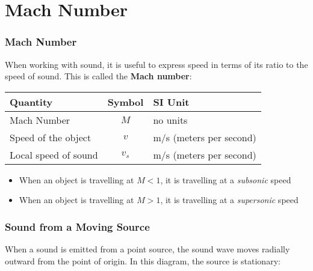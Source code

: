 \documentclass[12pt,aspectratio=169]{beamer}
\newcommand{\eq}[2]{\vspace{#1}{\Large\begin{displaymath}#2\end{displaymath}}}
\begin{document}
\section[$M$]{Mach Number}

\begin{frame}
  \frametitle{Mach Number}
  When working with sound, it is useful to express speed in terms of its ratio
  to the speed of sound. This is called the \textbf{Mach number}:
  
  \eq{-.2in}{
    \boxed{M=\frac{v}{v_s}}
  }
  \begin{center}
    \begin{tabular}{l|c|l}
      \rowcolor{pink}
      \textbf{Quantity} & \textbf{Symbol} & \textbf{SI Unit} \\ \hline
      Mach Number         & $M$   & no units \\
      Speed of the object & $v$   & \si{m/s} (meters per second) \\
      Local speed of sound & $v_s$ & \si{m/s} (meters per second)
    \end{tabular}
  \end{center}
  \begin{itemize}
  \item When an object is travelling at $M<1$, it is travelling at a
    \emph{subsonic} speed
  \item When an object is travelling at $M>1$, it is travelling at a
    \emph{supersonic} speed
  \end{itemize}
\end{frame}



\begin{frame}
  \frametitle{Sound from a Moving Source}
  When a sound is emitted from a point source, the sound wave moves radially
  outward from the point of origin. In this diagram, the source is stationary:
  \begin{center}
  \end{center}
\end{frame}
\end{document}
